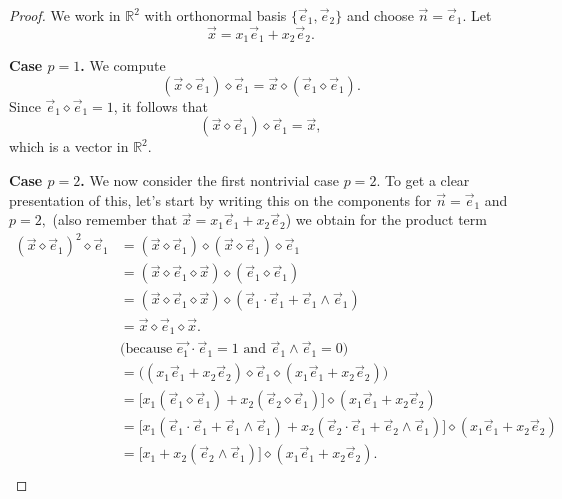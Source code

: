 \documentclass{amsart}
\theoremstyle{plain}
\numberwithin{equation}{section}
\begin{document}
\begin{proof}
We work in $\mathbb{R}^2$ with orthonormal basis
$\{\vec e_1,\vec e_2\}$ and choose $\vec n = \vec e_1$.
Let
\[
\vec x = x_1 \vec e_1 + x_2 \vec e_2.
\]

\medskip

\textbf{Case $p=1$.}
We compute
\[
(\vec x \diamond \vec e_1)\diamond \vec e_1
=
\vec x \diamond (\vec e_1 \diamond \vec e_1).
\]
Since $\vec e_1 \diamond \vec e_1 = 1$, it follows that
\[
(\vec x \diamond \vec e_1)\diamond \vec e_1 = \vec x,
\]
which is a vector in $\mathbb{R}^2$.

\medskip

\textbf{Case $p=2$.} 
We now consider the first nontrivial case $p=2$. To get a clear presentation of this, let's start by writing this on the components for $\vec{n}=\vec{e}_{1}$ and $p=2,$ (also remember that $\vec{x}=x_{1}\vec{e}_{1}+x_{2}\vec{e}_{2}$) we obtain for the product term
\begin{align*}
(\vec{x}\diamond \vec{e}_1)^2 \diamond \vec{e}_1
&=
(\vec{x}\diamond \vec{e}_1)\diamond(\vec{x}\diamond \vec{e}_1)\diamond \vec{e}_1 \\[4pt]
&=
(\vec{x}\diamond \vec{e}_1\diamond \vec{x})\diamond(\vec{e}_1\diamond \vec{e}_1) \\[4pt]
&=
(\vec{x}\diamond \vec{e}_1\diamond \vec{x})
\diamond
(\vec{e}_1\cdot \vec{e}_1 + \vec{e}_1\wedge \vec{e}_1) \\[4pt]
&=
\vec{x}\diamond \vec{e}_1\diamond \vec{x}. \quad \\
&\text{(because $\overrightarrow{e_{1}}\cdot \vec{e}_{1}=1$ and $\vec{e}_{1}\wedge \vec{e}_{1}=0$)} \\
&=
\Big( (x_1\vec{e}_1 + x_2\vec{e}_2)\diamond \vec{e}_1 \diamond (x_1\vec{e}_1 + x_2\vec{e}_2) \Big) \\[4pt]
&=
\Big[ x_1(\vec{e}_1\diamond \vec{e}_1)
     + x_2(\vec{e}_2\diamond \vec{e}_1) \Big]
\diamond
(x_1\vec{e}_1 + x_2\vec{e}_2) \\[4pt]
&=
\Big[ x_1(\vec{e}_1\cdot \vec{e}_1 + \vec{e}_1\wedge \vec{e}_1)
     + x_2(\vec{e}_2\cdot \vec{e}_1 + \vec{e}_2\wedge \vec{e}_1) \Big]
\diamond
(x_1\vec{e}_1 + x_2\vec{e}_2) \\[4pt]
&=
\Big[ x_1 + x_2(\vec{e}_2\wedge \vec{e}_1) \Big]
\diamond
(x_1\vec{e}_1 + x_2\vec{e}_2). \\

\end{align*}
\end{proof}
\end{document}
